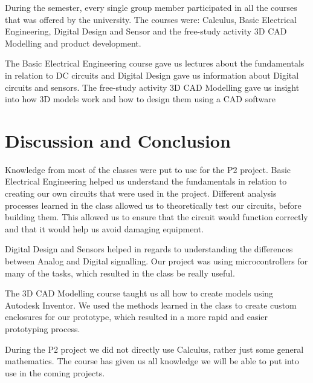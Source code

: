 During the semester, every single group member participated in all the courses that was offered by the university. The courses were: Calculus, Basic Electrical Engineering, Digital Design and Sensor and the free-study activity 3D CAD Modelling and product development.

The Basic Electrical Engineering course gave us lectures about the fundamentals in relation to DC circuits and Digital Design gave us information about Digital circuits and sensors. The free-study activity 3D CAD Modelling gave us insight into how 3D models work and how to design them using a CAD software

\section{Discussion and Conclusion}

Knowledge from most of the classes were put to use for the P2 project. Basic Electrical Engineering helped us understand the fundamentals in relation to creating our own circuits that were used in the project. Different analysis processes learned in the class allowed us to theoretically test our circuits, before building them. This allowed us to ensure that the circuit would function correctly and that it would help us avoid damaging equipment.

Digital Design and Sensors helped in regards to understanding the differences between Analog and Digital signalling. Our project was using microcontrollers for many of the tasks, which resulted in the class be really useful.

The 3D CAD Modelling course taught us all how to create models using Autodesk Inventor. We used the methods learned in the class to create custom enclosures for our prototype, which resulted in a more rapid and easier prototyping process. 

During the P2 project we did not directly use Calculus, rather just some general mathematics. The course has given us all knowledge we will be able to put into use in the coming projects.